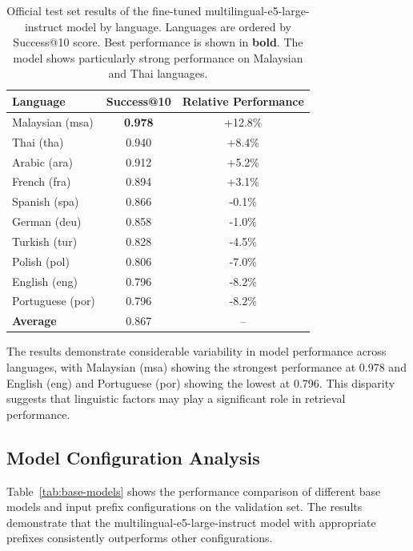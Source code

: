 \documentclass[11pt]{article}
\begin{document}
\begin{table}[t]
  \centering
  \small
  \begin{tabular}{lcc}
    \hline
    \textbf{Language} & \textbf{Success@10} & \textbf{Relative Performance} \\
    \hline
    Malaysian (msa) & \textbf{0.978} & +12.8\% \\
    Thai (tha) & 0.940 & +8.4\% \\
    Arabic (ara) & 0.912 & +5.2\% \\
    French (fra) & 0.894 & +3.1\% \\
    Spanish (spa) & 0.866 & -0.1\% \\
    German (deu) & 0.858 & -1.0\% \\
    Turkish (tur) & 0.828 & -4.5\% \\
    Polish (pol) & 0.806 & -7.0\% \\
    English (eng) & 0.796 & -8.2\% \\
    Portuguese (por) & 0.796 & -8.2\% \\
    \hline
    \textbf{Average} & 0.867 & -- \\
    \hline
  \end{tabular}
  \caption{Official test set results of the fine-tuned multilingual-e5-large-instruct model by language. Languages are ordered by Success@10 score. Best performance is shown in \textbf{bold}. The model shows particularly strong performance on Malaysian and Thai languages.}
  \label{tab:test-results-by-language}
\end{table}

The results demonstrate considerable variability in model performance across languages, with Malaysian (msa) showing the strongest performance at 0.978 and English (eng) and Portuguese (por) showing the lowest at 0.796. This disparity suggests that linguistic factors may play a significant role in retrieval performance.

\subsection{Model Configuration Analysis}

Table~\ref{tab:base-models} shows the performance comparison of different base models and input prefix configurations on the validation set. The results demonstrate that the multilingual-e5-large-instruct model with appropriate prefixes consistently outperforms other configurations.
\end{document}
